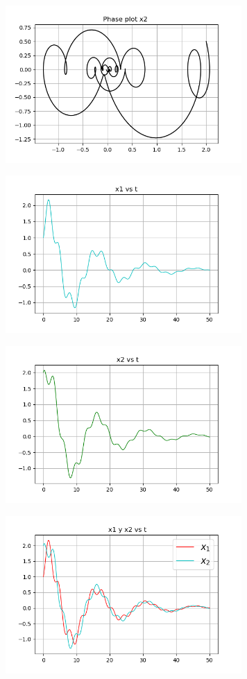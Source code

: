 \documentclass{article}
\begin{document}
\begin{center}
\includegraphics[height=6cm]{resortes2_4_2.png}
\end{center}


\begin{center}
\includegraphics[height=6cm]{resortes2_4_3.png}
\end{center}

\begin{center}
\includegraphics[height=6cm]{resortes2_4_4.png}
\end{center}

\begin{center}
\includegraphics[height=6cm]{resortes2_4_5.png}
\end{center}
\end{document}
